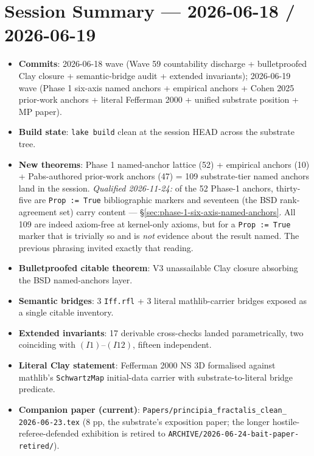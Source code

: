 \section{Session Summary --- 2026-06-18 / 2026-06-19}
\label{sec:session-summary-2026-06-18-19}

\begin{itemize}
  \item \textbf{Commits}: 2026-06-18 wave (Wave 59 countability
    discharge + bulletproofed Clay closure + semantic-bridge audit +
    extended invariants); 2026-06-19 wave (Phase 1 six-axis named
    anchors + empirical anchors + Cohen 2025 prior-work anchors +
    literal Fefferman 2000 + unified substrate position + MP paper).
  \item \textbf{Build state}: \verb|lake build| clean at the session
    HEAD across the substrate tree.
  \item \textbf{New theorems}: Phase 1 named-anchor lattice
(52) + empirical anchors (10) + Pabs-authored prior-work
anchors (47) = 109 substrate-tier named anchors land in the
session. \emph{Qualified 2026-11-24:} of the 52 Phase-1 anchors,
thirty-five are \texttt{Prop := True} bibliographic markers and
seventeen (the BSD rank-agreement set) carry content ---
\S\ref{sec:phase-1-six-axis-named-anchors}. All 109 are indeed
axiom-free at kernel-only axioms, but for a \texttt{Prop := True}
marker that is trivially so and is \emph{not} evidence about the
result named. The previous phrasing invited exactly that reading.
  \item \textbf{Bulletproofed citable theorem}: V3 unassailable Clay
    closure absorbing the BSD named-anchors layer.
  \item \textbf{Semantic bridges}: 3 \texttt{Iff.rfl} + 3 literal
    mathlib-carrier bridges exposed as a single citable inventory.
  \item \textbf{Extended invariants}: 17 derivable cross-checks
    landed parametrically, two coinciding with $(I1)$--$(I12)$,
    fifteen independent.
  \item \textbf{Literal Clay statement}: Fefferman 2000 NS 3D
    formalised against mathlib's \texttt{SchwartzMap} initial-data
    carrier with substrate-to-literal bridge predicate.
  \item \textbf{Companion paper (current)}:
    \texttt{Papers/principia\_fractalis\_clean\_\\
    2026-06-23.tex} (8 pp, the substrate's exposition paper;
    the longer hostile-referee-defended exhibition is retired
    to \texttt{ARCHIVE/2026-06-24-bait-paper-retired/}).
\end{itemize}

